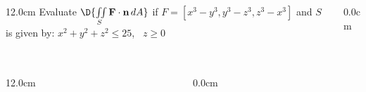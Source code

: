 \begin{frame}
\frametitle{}
\scriptsize
\begin{columns}
\begin{column}{12.0cm}
Evaluate \quad $\D{\iint \limits_{S} {\bf F} \cdot {\bf n} \, dA}$	\quad if $F = [x^3-y^3,y^3-z^3,z^3-x^3]$ and $S$ is given by: $x^2 + y^2 + z^2 \le 25$, \, $z \ge 0$

\vspace{8.2cm}

\end{column}
\begin{column}{0.0cm}\end{column}
\end{columns}
\end{frame}

\begin{frame}
\frametitle{}
\scriptsize
\begin{columns}
\begin{column}{12.0cm}
	
\end{column}
\begin{column}{0.0cm}\end{column}
\end{columns}
\end{frame}
